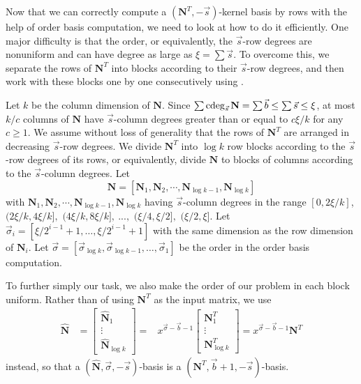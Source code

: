 Now that we can correctly compute a $\left(\mathbf{N}^{T},-\vec{s}\right)$-kernel
basis by rows with the help of order basis computation, we need to
look at how to do it efficiently. One major difficulty is that the
order, or equivalently, the $\vec{s}$-row degrees are nonuniform
and can have degree as large as $\xi=\sum\vec{s}$. To overcome this,
we separate the rows of $\mathbf{N}^{T}$ into blocks according to
their $\vec{s}$-row degrees, and then work with these blocks one
by one consecutively using . 



Let $k$ be the column dimension of $\mathbf{N}$. Since $\sum\cdeg_{\vec{s}}\mathbf{N}=\sum\vec{b}\le\sum\vec{s}\le\xi$,
at most $k/c$ columns of $\mathbf{N}$ have $\vec{s}$-column degrees
greater than or equal to $c\xi/k$ for any $c\ge1$. We assume without
loss of generality that the rows of $\mathbf{N}^{T}$ are arranged
in decreasing $\vec{s}$-row degrees. We divide $\mathbf{N}^{T}$
into $\log k$ row blocks according to the $\vec{s}$-row degrees
of its rows, or equivalently, divide $\mathbf{N}$ to blocks of columns
according to the $\vec{s}$-column degrees. Let 
\[
\mathbf{N}=\left[\mathbf{N}_{1},\mathbf{N}_{2},\cdots,\mathbf{N}_{\log k-1},\mathbf{N}_{\log k}\right]
\]
with $\mathbf{N}_{1},\mathbf{N}_{2},\cdots,\mathbf{N}_{\log k-1},\mathbf{N}_{\log k}$
having $\vec{s}$-column degrees in the range $\left[0,2\xi/k\right]$,
$(2\xi/k,4\xi/k],$ $(4\xi/k,8\xi/k],\ ...,$ $(\xi/4,\xi/2],$ $(\xi/2,\xi].$
Let $\vec{\sigma}_{i}=\left[\xi/2^{i-1}+1,\dots,\xi/2^{i-1}+1\right]$
with the same dimension as the row dimension of $\mathbf{N}_{i}$.
Let $\vec{\sigma}=\left[\vec{\sigma}_{\log k},\vec{\sigma}_{\log k-1},\dots,\vec{\sigma}_{1}\right]$
be the order in the order basis computation.

To further simply our task, we also make the order of our problem
in each block uniform. Rather than of using $\mathbf{N}^{T}$ as the
input matrix, we use 
\begin{eqnarray*}
\hat{\mathbf{N}} & =\begin{bmatrix}\hat{\mathbf{N}}_{1}\\
\vdots\\
\hat{\mathbf{N}}_{\log k}
\end{bmatrix}= & x^{\vec{\sigma}-\vec{b}-1}\begin{bmatrix}\mathbf{N}_{1}^{T}\\
\vdots\\
\mathbf{N}_{\log k}^{T}
\end{bmatrix}=x^{\vec{\sigma}-\vec{b}-1}\mathbf{N}^{T}
\end{eqnarray*}
 instead, so that a $\left(\hat{\mathbf{N}},\vec{\sigma},-\vec{s}\right)$-basis
is a $\left(\mathbf{N}^{T},\vec{b}+1,-\vec{s}\right)$-basis.

